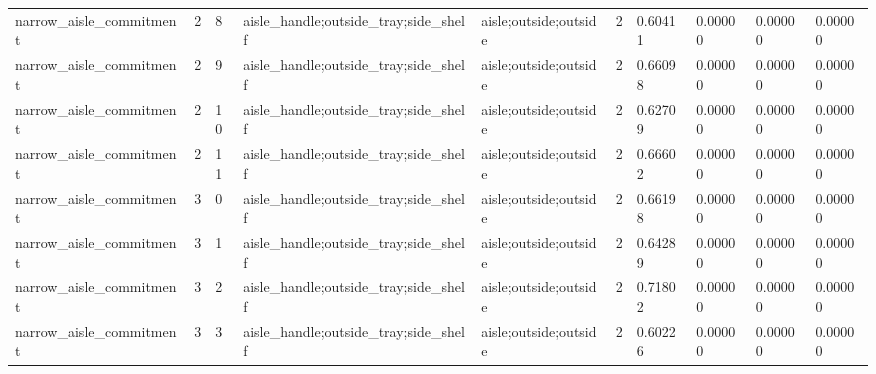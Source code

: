\documentclass{article}
\begin{document}
\begin{table}[tbp]
{\begin{tabular}{llllllllll}
narrow\_aisle\_commitment & 2 & 8 & aisle\_handle;outside\_tray;side\_shelf & aisle;outside;outside & 2 & 0.60411 & 0.00000 & 0.00000 & 0.00000 \\
narrow\_aisle\_commitment & 2 & 9 & aisle\_handle;outside\_tray;side\_shelf & aisle;outside;outside & 2 & 0.66098 & 0.00000 & 0.00000 & 0.00000 \\
narrow\_aisle\_commitment & 2 & 10 & aisle\_handle;outside\_tray;side\_shelf & aisle;outside;outside & 2 & 0.62709 & 0.00000 & 0.00000 & 0.00000 \\
narrow\_aisle\_commitment & 2 & 11 & aisle\_handle;outside\_tray;side\_shelf & aisle;outside;outside & 2 & 0.66602 & 0.00000 & 0.00000 & 0.00000 \\
narrow\_aisle\_commitment & 3 & 0 & aisle\_handle;outside\_tray;side\_shelf & aisle;outside;outside & 2 & 0.66198 & 0.00000 & 0.00000 & 0.00000 \\
narrow\_aisle\_commitment & 3 & 1 & aisle\_handle;outside\_tray;side\_shelf & aisle;outside;outside & 2 & 0.64289 & 0.00000 & 0.00000 & 0.00000 \\
narrow\_aisle\_commitment & 3 & 2 & aisle\_handle;outside\_tray;side\_shelf & aisle;outside;outside & 2 & 0.71802 & 0.00000 & 0.00000 & 0.00000 \\
narrow\_aisle\_commitment & 3 & 3 & aisle\_handle;outside\_tray;side\_shelf & aisle;outside;outside & 2 & 0.60226 & 0.00000 & 0.00000 & 0.00000 \\
\bottomrule
\end{tabular}
}
\end{table}

\clearpage
\end{document}
